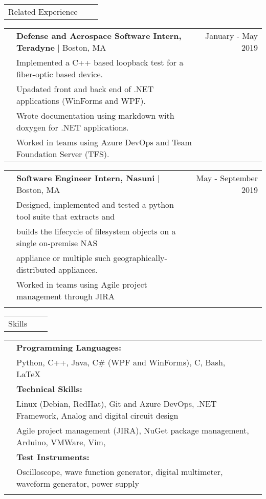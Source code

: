 \documentclass[letterpaper,10pt,oneside]{article}
\begin{document}
\noindent \begin{tabularx}{\linewidth}{@{} l l R }
     \Large{Related Experience}\\
\end{tabularx}

\noindent \begin{tabularx}{\linewidth}{@{} l l R }
     & \textbf{Defense and Aerospace Software Intern, Teradyne} $\mid$ Boston, MA & January - May 2019 \\
     & Implemented a C++ based loopback test for a fiber-optic based device.\\
     & Upadated front and back end of .NET applications (WinForms and WPF).\\
     & Wrote documentation using markdown with doxygen for .NET applications.\\
     & Worked in teams using Azure DevOps and Team Foundation Server (TFS).\\
\end {tabularx}

\noindent \begin{tabularx}{\linewidth}{@{} l l R }
     & \textbf{Software Engineer Intern, Nasuni} $\mid$ Boston, MA & May - September 2019 \\
     & Designed, implemented and tested a python tool suite that extracts and\\
     & \indent builds the lifecycle of filesystem objects on a single on-premise NAS\\
     & \indent appliance or multiple such geographically-distributed appliances.\\
     & Worked in teams using Agile project management through JIRA\\
     \\
\end{tabularx}

 \noindent \begin{tabularx}{\linewidth}{@{} l l R } 
     \Large{Skills}\\
 \end{tabularx}
 \noindent \begin{tabularx}{\linewidth}{@{} l l l }
     &\textbf{Programming Languages:}\\
     &Python, C++, Java, C\# (WPF and WinForms), C, Bash, \LaTeX  \\
     &\textbf{Technical Skills:}\\
     &Linux (Debian, RedHat), Git and Azure DevOps, .NET Framework, Analog and digital circuit design\\
     &Agile project management (JIRA), NuGet package management, Arduino, VMWare, Vim,\\
     &\textbf{Test Instruments:}\\
     &Oscilloscope, wave function generator, digital multimeter, waveform generator, power supply\\
     \\
 \end{tabularx}
\end{document}
